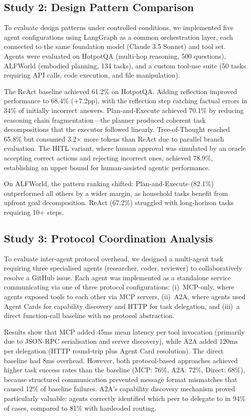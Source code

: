 \documentclass[12pt, a4paper]{article}
\begin{document}
\subsection{Study 2: Design Pattern Comparison}
To evaluate design patterns under controlled conditions, we implemented five agent configurations using LangGraph as a common orchestration layer, each connected to the same foundation model (Claude 3.5 Sonnet) and tool set. Agents were evaluated on HotpotQA (multi-hop reasoning, 500 questions), ALFWorld (embodied planning, 134 tasks), and a custom tool-use suite (50 tasks requiring API calls, code execution, and file manipulation).

The ReAct baseline achieved 61.2\% on HotpotQA. Adding reflection improved performance to 68.4\% (+7.2pp), with the reflection step catching factual errors in 34\% of initially incorrect answers. Plan-and-Execute achieved 70.1\% by reducing reasoning chain fragmentation---the planner produced coherent task decompositions that the executor followed linearly. Tree-of-Thought reached 65.8\% but consumed 3.2$\times$ more tokens than ReAct due to parallel branch evaluation. The HITL variant, where human approval was simulated by an oracle accepting correct actions and rejecting incorrect ones, achieved 78.9\%, establishing an upper bound for human-assisted agentic performance.

On ALFWorld, the pattern ranking shifted: Plan-and-Execute (82.1\%) outperformed all others by a wider margin, as household tasks benefit from upfront goal decomposition. ReAct (67.2\%) struggled with long-horizon tasks requiring 10+ steps.

\subsection{Study 3: Protocol Coordination Analysis}
To evaluate inter-agent protocol overhead, we designed a multi-agent task requiring three specialised agents (researcher, coder, reviewer) to collaboratively resolve a GitHub issue. Each agent was implemented as a standalone service communicating via one of three protocol configurations: (i)~MCP-only, where agents exposed tools to each other via MCP servers, (ii)~A2A, where agents used Agent Cards for capability discovery and HTTP for task delegation, and (iii)~a direct function-call baseline with no protocol abstraction.

Results show that MCP added 45ms mean latency per tool invocation (primarily due to JSON-RPC serialisation and server discovery), while A2A added 120ms per delegation (HTTP round-trip plus Agent Card resolution). The direct baseline had 8ms overhead. However, both protocol-based approaches achieved higher task success rates than the baseline (MCP: 76\%, A2A: 72\%, Direct: 68\%), because structured communication prevented message format mismatches that caused 12\% of baseline failures. A2A's capability discovery mechanism proved particularly valuable: agents correctly identified which peer to delegate to in 94\% of cases, compared to 81\% with hardcoded routing.
\end{document}
